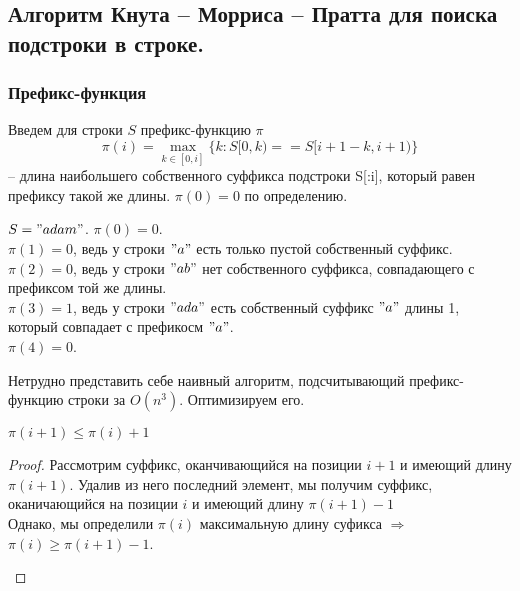\subsection{Алгоритм Кнута -- Морриса -- Пратта для поиска подстроки в строке.}%

\subsubsection{Префикс-функция}
Введем для строки $S$ префикс-функцию $\pi$ 
\[
	\pi(i) = \max \limits_{k \in [0, i]} \{k: S[0, k) == S[i + 1 - k, i +1)\}
\]
-- длина наибольшего собственного суффикса подстроки S[:i], который равен префиксу такой же длины. $\pi(0) = 0$ по определению.

\begin{example}
	$S = "adam"$. 
	$\pi(0) = 0$. \\
	$\pi(1) = 0$, ведь у строки  $"a"$ есть только пустой собственный суффикс. \\
	$\pi(2) = 0$, ведь у строки $"ab"$ нет собственного суффикса, совпадающего с префиксом той же длины. \\
	$\pi(3) = 1$, ведь у строки  $"ada"$ есть собственный суффикс  $"a"$ длины 1, который совпадает с префикосм  $"a"$. \\
	$\pi(4) = 0$. \\
\end{example}

Нетрудно представить себе наивный алгоритм, подсчитывающий префикс-функцию строки за $O(n^3)$. Оптимизируем его.



 \begin{prop}
	 $\pi(i + 1) \leq \pi(i) + 1$
\end{prop}
\begin{proof}
	Рассмотрим суффикс, оканчивающийся на позиции $i + 1$ и имеющий длину $\pi(i + 1)$. Удалив из него последний элемент, мы получим суффикс, оканичающийся на позиции $i$ и имеющий длину  $\pi(i + 1) - 1$\\
	Однако, мы определили $\pi(i)$ максимальную длину суфикса  $\Rightarrow$ $\pi(i) \geq \pi(i + 1) - 1$.
	\begin{center}
	\end{center}
\end{proof}

